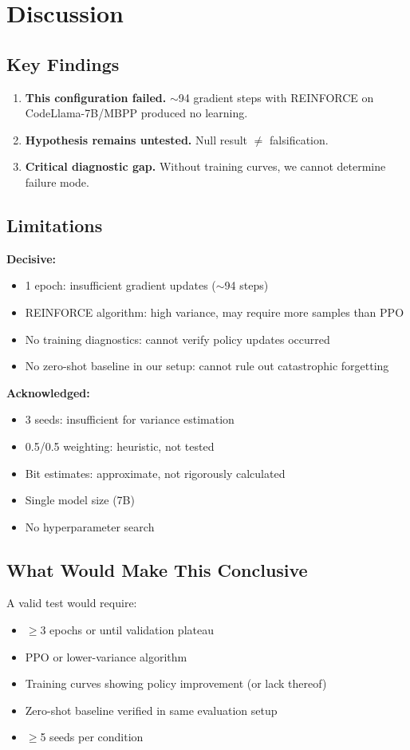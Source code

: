 \section{Discussion}

\subsection{Key Findings}

\begin{enumerate}
    \item \textbf{This configuration failed.} $\sim$94 gradient steps with REINFORCE on CodeLlama-7B/MBPP produced no learning.
    \item \textbf{Hypothesis remains untested.} Null result $\neq$ falsification.
    \item \textbf{Critical diagnostic gap.} Without training curves, we cannot determine failure mode.
\end{enumerate}

\subsection{Limitations}

\textbf{Decisive:}
\begin{itemize}
    \item 1 epoch: insufficient gradient updates ($\sim$94 steps)
    \item REINFORCE algorithm: high variance, may require more samples than PPO
    \item No training diagnostics: cannot verify policy updates occurred
    \item No zero-shot baseline in our setup: cannot rule out catastrophic forgetting
\end{itemize}

\textbf{Acknowledged:}
\begin{itemize}
    \item 3 seeds: insufficient for variance estimation
    \item 0.5/0.5 weighting: heuristic, not tested
    \item Bit estimates: approximate, not rigorously calculated
    \item Single model size (7B)
    \item No hyperparameter search
\end{itemize}

\subsection{What Would Make This Conclusive}

A valid test would require:
\begin{itemize}
    \item $\geq$3 epochs or until validation plateau
    \item PPO or lower-variance algorithm
    \item Training curves showing policy improvement (or lack thereof)
    \item Zero-shot baseline verified in same evaluation setup
    \item $\geq$5 seeds per condition
\end{itemize}
